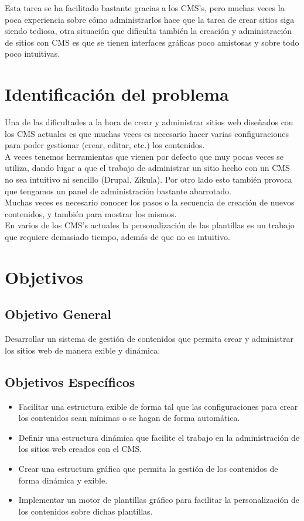 Esta tarea se ha facilitado bastante gracias a los CMS's, pero muchas veces la poca experiencia sobre c\'omo administrarlos hace que la tarea de crear sitios siga siendo tediosa, otra situaci\'on que dificulta tambi\'en la creaci\'on y administraci\'on de sitios con CMS es que se tienen interfaces gr\'aficas poco amistosas y sobre todo poco intuitivas.

\section{Identificaci\'on del problema}
Una de las dificultades a la hora de crear y administrar sitios web dise\~nados con los CMS actuales es que muchas veces es necesario hacer varias configuraciones para poder gestionar (crear, editar, etc.) los contenidos.\\

A veces tenemos herramientas que vienen por defecto que muy pocas veces se utiliza, dando lugar a que el trabajo de administrar un sitio hecho con un CMS no sea intuitivo ni sencillo (Drupal, Zikula). Por otro lado esto tambi\'en provoca que tengamos un panel de administraci\'on bastante abarrotado.\\
Muchas veces es necesario conocer los pasos o la secuencia de creaci\'on de nuevos contenidos, y tambi\'en para mostrar los mismos.\\

En varios de los CMS's actuales la personalizaci\'on de las plantillas es un trabajo que requiere demasiado tiempo, adem\'as de que no es intuitivo.\\

\section{Objetivos}
\subsection{Objetivo General}
Desarrollar un sistema de gesti\'on de contenidos que permita crear y administrar los sitios web de manera exible y din\'amica.

\subsection{Objetivos Espec\'ificos}
\begin{itemize}
  \item Facilitar una estructura exible de forma tal que las configuraciones para crear los contenidos sean m\'inimas o se hagan de forma autom\'atica.
  \item Definir una estructura din\'amica que facilite el trabajo en la administraci\'on de los sitios web creados con el CMS.
  \item Crear una estructura gr\'afica que permita la gesti\'on de los contenidos de forma din\'amica y exible.
  \item Implementar un motor de plantillas gr\'afico para facilitar la personalizaci\'on de los contenidos sobre dichas plantillas.
\end{itemize}

